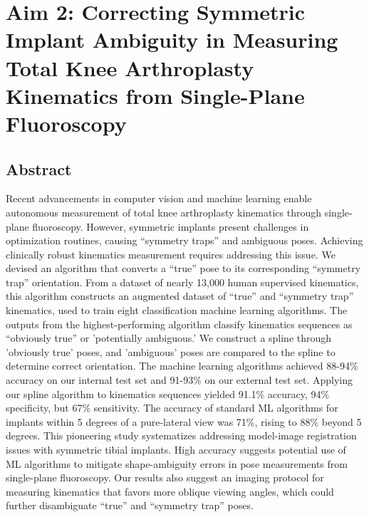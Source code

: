 \chapter{Aim 2: Correcting Symmetric Implant Ambiguity in Measuring Total Knee Arthroplasty Kinematics from Single-Plane Fluoroscopy}

\section{Abstract}
Recent advancements in computer vision and machine learning enable autonomous measurement of total knee arthroplasty kinematics through single-plane fluoroscopy.
However, symmetric implants present challenges in optimization routines, causing “symmetry traps” and ambiguous poses.
Achieving clinically robust kinematics measurement requires addressing this issue.
We devised an algorithm that converts a “true” pose to its corresponding “symmetry trap” orientation.
From a dataset of nearly 13,000 human supervised kinematics, this algorithm constructs an augmented dataset of “true” and “symmetry trap” kinematics, used to train eight classification machine learning algorithms.
The outputs from the highest-performing algorithm classify kinematics sequences as ``obviously true'' or 'potentially ambiguous.'
We construct a spline through 'obviously true' poses, and 'ambiguous' poses are compared to the spline to determine correct orientation.
The machine learning algorithms achieved 88-94\% accuracy on our internal test set and 91-93\% on our external test set.
Applying our spline algorithm to kinematics sequences yielded 91.1\% accuracy, 94\% specificity, but 67\% sensitivity.
The accuracy of standard ML algorithms for implants within 5 degrees of a pure-lateral view was 71\%, rising to 88\% beyond 5 degrees.
This pioneering study systematizes addressing model-image registration issues with symmetric tibial implants.
High accuracy suggests potential use of ML algorithms to mitigate shape-ambiguity errors in pose measurements from single-plane fluoroscopy.
Our results also suggest an imaging protocol for measuring kinematics that favors more oblique viewing angles, which could further disambiguate “true” and “symmetry trap” poses.

